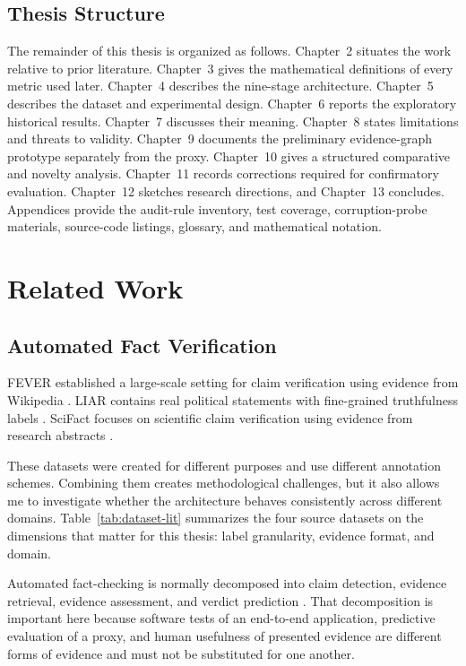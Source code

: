 \documentclass[12pt,a4paper,openany]{report}
\begin{document}
\section{Thesis Structure}
The remainder of this thesis is organized as follows. Chapter~2 situates the work relative to prior literature. Chapter~3 gives the mathematical definitions of every metric used later. Chapter~4 describes the nine-stage architecture. Chapter~5 describes the dataset and experimental design. Chapter~6 reports the exploratory historical results. Chapter~7 discusses their meaning. Chapter~8 states limitations and threats to validity. Chapter~9 documents the preliminary evidence-graph prototype separately from the proxy. Chapter~10 gives a structured comparative and novelty analysis. Chapter~11 records corrections required for confirmatory evaluation. Chapter~12 sketches research directions, and Chapter~13 concludes. Appendices provide the audit-rule inventory, test coverage, corruption-probe materials, source-code listings, glossary, and mathematical notation.

\chapter{Related Work}
\section{Automated Fact Verification}
FEVER established a large-scale setting for claim verification using evidence from Wikipedia \citep{thorne2018fever}. LIAR contains real political statements with fine-grained truthfulness labels \citep{wang2017liar}. SciFact focuses on scientific claim verification using evidence from research abstracts \citep{wadden2020fact}.

These datasets were created for different purposes and use different annotation schemes. Combining them creates methodological challenges, but it also allows me to investigate whether the architecture behaves consistently across different domains. Table~\ref{tab:dataset-lit} summarizes the four source datasets on the dimensions that matter for this thesis: label granularity, evidence format, and domain.

Automated fact-checking is normally decomposed into claim detection,
evidence retrieval, evidence assessment, and verdict prediction
\citep{guo2022survey}. That decomposition is important here because software
tests of an end-to-end application, predictive evaluation of a proxy, and
human usefulness of presented evidence are different forms of evidence and
must not be substituted for one another.
\end{document}
